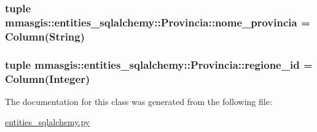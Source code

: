 \hypertarget{classmmasgis_1_1entities__sqlalchemy_1_1Provincia_aba38808735156b3c6c4d62231487dbd4}{
\subsubsection[{nome\_\-provincia}]{\setlength{\rightskip}{0pt plus 5cm}tuple {\bf mmasgis::entities\_\-sqlalchemy::Provincia::nome\_\-provincia} = Column(String)}}
\label{classmmasgis_1_1entities__sqlalchemy_1_1Provincia_aba38808735156b3c6c4d62231487dbd4}
\hypertarget{classmmasgis_1_1entities__sqlalchemy_1_1Provincia_ae9115b62bb12c07ef67033c45739b784}{
\subsubsection[{regione\_\-id}]{}}
\label{classmmasgis_1_1entities__sqlalchemy_1_1Provincia_ae9115b62bb12c07ef67033c45739b784}
\hypertarget{classmmasgis_1_1entities__sqlalchemy_1_1Provincia_a52a3fa0f63409db8283554bfd82d50a3}{
\subsubsection[{regione\_\-id}]{\setlength{\rightskip}{0pt plus 5cm}tuple {\bf mmasgis::entities\_\-sqlalchemy::Provincia::regione\_\-id} = Column(Integer)}}
\label{classmmasgis_1_1entities__sqlalchemy_1_1Provincia_a52a3fa0f63409db8283554bfd82d50a3}


The documentation for this class was generated from the following file:\begin{DoxyCompactItemize}
\item 
\hyperlink{entities__sqlalchemy_8py}{entities\_\-sqlalchemy.py}\end{DoxyCompactItemize}
